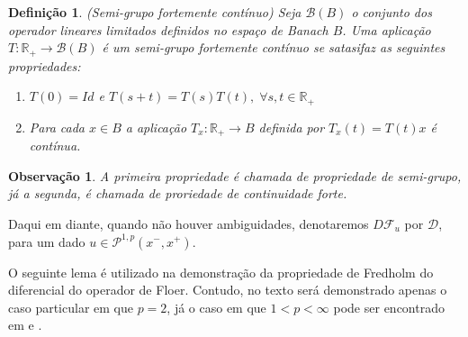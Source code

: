 \documentclass[12pt]{book}
\newtheorem{definicao}[teorema]{Definição}
\newtheorem{observacao}[teorema]{Observação}
\newcommand{\caminhosexponenciaisconectantes}[2]{\mathcal{P}^{1,p}(#1, #2)}
\newcommand{\caminhosexponenciaisconectantespadrao}{\caminhosexponenciaisconectantes{x^{-}}{x^{+}}}
\newcommand{\diferencialfloerabrev}{\mathcal{D}}
\newcommand{\operadorFloer}{\mathcal{F}}
\newcommand{\real}[1]{\mathbb{R}^{#1}}
\newcommand{\reta}{\real{}}
\begin{document}
	\begin{definicao} (Semi-grupo fortemente contínuo)
		Seja $\mathcal{B}(B)$ o conjunto dos operador lineares limitados definidos no espaço de Banach $B$. Uma aplicação $T:\real{}_{+}\to \mathcal{B}(B)$ é um semi-grupo fortemente contínuo se satasifaz as seguintes propriedades:
			
			\begin{enumerate}
				\item $T(0) = Id$ e $T(s+t) = T(s)T(t), \;\forall s, t \in \real{}_{+}$
				
				\item Para cada $x\in B$ a aplicação $T_{x}: \reta_{+}\to B$ definida por $T_{x}(t) = T(t)x$ é contínua.
			\end{enumerate}
	
	\end{definicao}
	
	\begin{observacao}
		A primeira propriedade é chamada de  propriedade de semi-grupo, já a segunda, é chamada de proriedade de continuidade forte.
	\end{observacao}
	
	Daqui em diante, quando não houver ambiguidades, denotaremos $D\operadorFloer_{u}$ por $\diferencialfloerabrev$, para um dado $u\in \caminhosexponenciaisconectantespadrao$.
	
	O seguinte lema é utilizado na demonstração da propriedade de Fredholm do diferencial do operador de Floer. Contudo, no texto será demonstrado apenas o caso particular em que $p=2$, já o caso em que $1 <p<\infty$ pode ser encontrado em \cite{salamon_lecture} e \cite{audi_floer_homology}.
	
\end{document}

